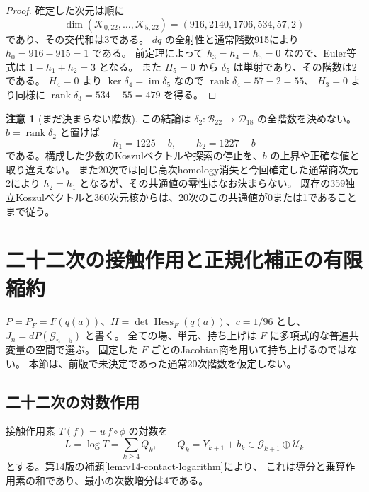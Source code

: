 \documentclass[a4paper,11pt]{ltjsarticle}
\theoremstyle{definition}
\newtheorem{remark}[theorem]{注意}
\begin{document}
\begin{proof}
確定した次元は順に
\[
 \dim(\mathcal K_{0,22},\ldots,\mathcal K_{5,22})
   =(916,2140,1706,534,57,2)
\]
であり、その交代和は3である。
$dq$ の全射性と通常階数915により $h_0=916-915=1$ である。
前定理によって $h_3=h_4=h_5=0$ なので、Euler等式は
$1-h_1+h_2=3$ となる。
また $H_5=0$ から $\delta_5$ は単射であり、その階数は2である。
$H_4=0$ より $\ker\delta_4=\operatorname{im}\delta_5$ なので
$\operatorname{rank}\delta_4=57-2=55$、
$H_3=0$ より同様に $\operatorname{rank}\delta_3=534-55=479$ を得る。
\end{proof}

\begin{remark}[まだ決まらない階数]
この結論は $\delta_2:\mathcal B_{22}\to\mathcal D_{18}$ の全階数を決めない。
$b=\operatorname{rank}\delta_2$ と置けば
\[
 h_1=1225-b,\qquad h_2=1227-b
\]
である。構成した少数のKoszulベクトルや探索の停止を、$b$ の上界や正確な値と取り違えない。
また20次では同じ高次homology消失と今回確定した通常商次元2により
$h_2=h_1$ となるが、その共通値の零性はなお決まらない。
既存の359独立Koszulベクトルと360次元核からは、20次のこの共通値が0または1であることまで従う。
\end{remark}





\section{二十二次の接触作用と正規化補正の有限縮約}
\label{sec:v16-contact-twenty-second}

$P=P_F=F(q(a))$、$H=\det\operatorname{Hess}_F(q(a))$、$c=1/96$ とし、
$J_n=dP(\mathcal G_{n-5})$ と書く。
全ての場、単元、持ち上げは $F$ に多項式的な普遍共変量の空間で選ぶ。
固定した $F$ ごとのJacobian商を用いて持ち上げるのではない。
本節は、前版で未決定であった通常20次階数を仮定しない。

\subsection{二十二次の対数作用}

接触作用素 $T(f)=u\,f\circ\phi$ の対数を
\[
 L=\log T=\sum_{k\ge4}Q_k,\qquad
 Q_k=Y_{k+1}+b_k\in\mathcal G_{k+1}\oplus\mathcal U_k
\]
とする。第14版の補題\ref{lem:v14-contact-logarithm}により、
これは導分と乗算作用素の和であり、最小の次数増分は4である。
\end{document}
